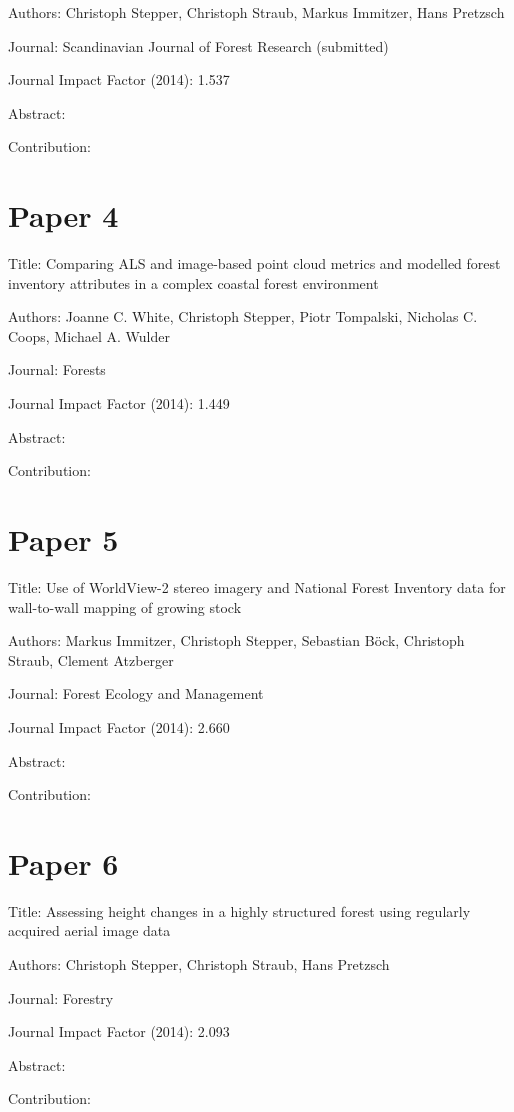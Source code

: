 Authors: Christoph Stepper, Christoph Straub, Markus Immitzer, Hans Pretzsch

Journal: Scandinavian Journal of Forest Research (submitted)

Journal Impact Factor (2014): 1.537

Abstract:

Contribution:



\section{Paper 4}\label{sec:Paper4}

Title: Comparing ALS and image-based point cloud metrics and modelled forest inventory attributes in a complex coastal forest environment

Authors: Joanne C. White, Christoph Stepper, Piotr Tompalski, Nicholas C. Coops, Michael A. Wulder

Journal: Forests

Journal Impact Factor (2014): 1.449

Abstract:

Contribution:



\section{Paper 5}\label{sec:Paper5}

Title: Use of WorldView-2 stereo imagery and National Forest Inventory data for wall-to-wall mapping of growing stock

Authors: Markus Immitzer, Christoph Stepper, Sebastian Böck, Christoph Straub, Clement Atzberger

Journal: Forest Ecology and Management

Journal Impact Factor (2014): 2.660

Abstract:

Contribution:



\section{Paper 6}\label{sec:Paper6}

Title: Assessing height changes in a highly structured forest using regularly acquired aerial image data 

Authors: Christoph Stepper, Christoph Straub, Hans Pretzsch

Journal: Forestry

Journal Impact Factor (2014): 2.093

Abstract:

Contribution: